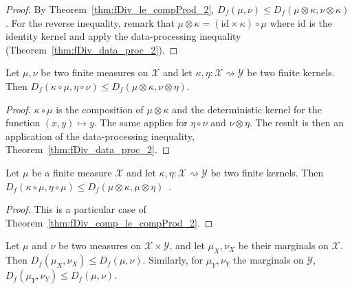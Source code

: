 \begin{proof}\leanok
{}
By Theorem~\ref{thm:fDiv_le_compProd_2}, $D_f(\mu, \nu) \le D_f(\mu \otimes \kappa, \nu \otimes \kappa)$.
For the reverse inequality, remark that $\mu \otimes \kappa = (\text{id} \times \kappa) \circ \mu$ where $\text{id}$ is the identity kernel and apply the data-processing inequality (Theorem~\ref{thm:fDiv_data_proc_2}). 
\end{proof}

\begin{theorem}
  \label{thm:fDiv_comp_le_compProd_2}
  \leanok
  Let $\mu, \nu$ be two finite measures on $\mathcal X$ and let $\kappa, \eta : \mathcal X \rightsquigarrow \mathcal Y$ be two finite kernels.
  Then $D_f(\kappa \circ \mu, \eta \circ \nu) \le D_f(\mu \otimes \kappa, \nu \otimes \eta)$.
\end{theorem}

\begin{proof}\leanok
{}
$\kappa \circ \mu$ is the composition of $\mu \otimes \kappa$ and the deterministic kernel for the function $(x,y) \mapsto y$. The same applies for $\eta \circ \nu$ and $\nu \otimes \eta$.
The result is then an application of the data-processing inequality, Theorem~\ref{thm:fDiv_data_proc_2}.
\end{proof}


\begin{theorem}
  \label{thm:fDiv_comp_le_condFDiv_2}
  \leanok
  Let $\mu$ be a finite measure $\mathcal X$ and let $\kappa, \eta : \mathcal X \rightsquigarrow \mathcal Y$ be two finite kernels.
  Then $D_f(\kappa \circ \mu, \eta \circ \mu) \le D_f(\mu \otimes \kappa, \mu \otimes \eta)$~.
\end{theorem}

\begin{proof}\leanok
{}
This is a particular case of Theorem~\ref{thm:fDiv_comp_le_compProd_2}.
\end{proof}


\begin{theorem}[Marginals]
  \label{thm:fDiv_fst_le_2}
  \leanok
  Let $\mu$ and $\nu$ be two measures on $\mathcal X \times \mathcal Y$, and let $\mu_X, \nu_X$ be their marginals on $\mathcal X$.
  Then $D_f(\mu_X, \nu_X) \le D_f(\mu, \nu)$.
  Similarly, for $\mu_Y, \nu_Y$ the marginals on $\mathcal Y$, $D_f(\mu_Y, \nu_Y) \le D_f(\mu, \nu)$.
\end{theorem}

